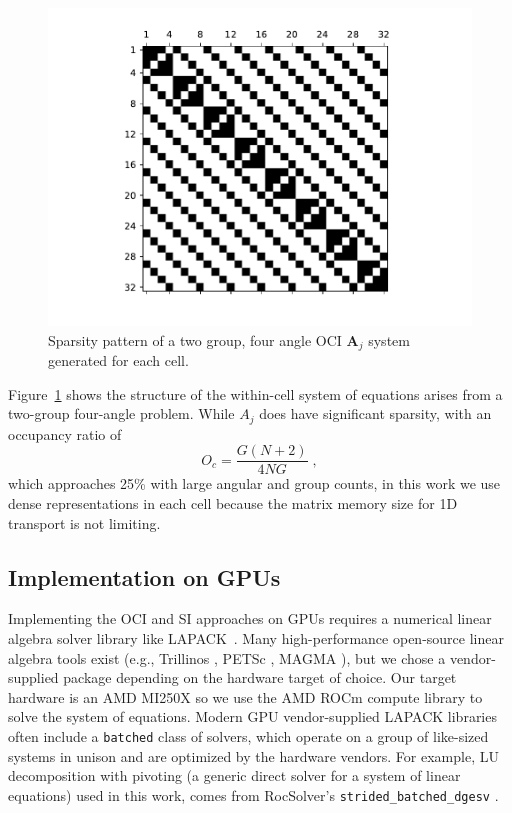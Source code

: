 \begin{figure}
    \centering
    \includegraphics[width=.9\textwidth]{deterministic/therefore_paper/therefore_figs/spy.pdf}
    \caption{Sparsity pattern of a two group, four angle OCI $\bm{A}_j$ system generated for each cell.}
    \label{fig:spyA}
\end{figure}

Figure~\ref{fig:spyA} shows the structure of the within-cell system of equations arises from a two-group four-angle problem.
While $A_j$ does have significant sparsity, with an occupancy ratio of
\begin{equation}
    O_c = \frac{G(N+2)}{4NG} 
    \; ,
\end{equation}
which approaches 25\% with large angular and group counts, in this work we use dense representations in each cell because the matrix memory size for 1D transport is not limiting.

\subsection{Implementation on GPUs}

Implementing the OCI and SI approaches on GPUs requires a numerical linear algebra solver library like LAPACK~\cite{laug}.
Many high-performance open-source linear algebra tools exist (e.g., Trillinos \cite{trilinos-website}, PETSc \cite{petsc-user-ref}, MAGMA \cite{magma}), but we chose a vendor-supplied package depending on the hardware target of choice.
Our target hardware is an AMD MI250X so we use the AMD ROCm compute library to solve the system of equations.
Modern GPU vendor-supplied LAPACK libraries often include a \texttt{batched} class of solvers,
which operate on a group of like-sized systems in unison and are optimized by the hardware vendors.
For example, LU decomposition with pivoting (a generic direct solver for a system of linear equations) used in this work, comes from RocSolver's \texttt{strided\_batched\_dgesv} \cite{rocsolver}.

